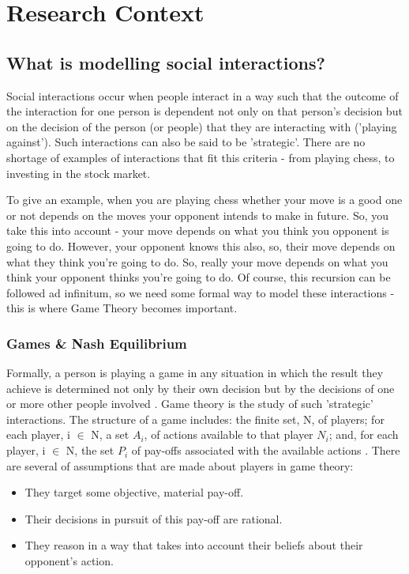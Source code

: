 \documentclass[12pt]{article}
\newcommand*{\np}{\par\noindent\newline}
\begin{document}
\section{Research Context}
\subsection{What is modelling social interactions?}
Social interactions occur when people interact in a way such that the outcome
of the interaction for one person is dependent not  only on that person's
decision but on the decision of the person (or people) that they are interacting with ('playing against'). Such interactions can also be said to be
'strategic'. There are no shortage of examples of interactions that fit this
criteria - from playing chess, to investing in the stock market.
\np To give an example, when you are playing chess whether your move is a good
one or not depends on the moves your opponent intends to make in future. So,
you take this into account - your move depends on what you think you opponent
is going to do. However, your opponent knows this also, so, their move depends
on what they think you're going to do. So, really your move depends on what you
think your opponent thinks you're going to do. Of course, this recursion can be
followed ad infinitum, so we need some formal way to model these interactions
- this is where Game Theory becomes important.

\subsubsection{Games \& Nash Equilibrium}
Formally, a person is playing a game in any situation in which the result they
achieve is determined not only by their own decision but by the decisions of
one or more other people involved \cite{angner_course_2012}. Game theory is the
study of such 'strategic' interactions.
The structure of a game includes: the finite set, N, of players; for each
player, i $\in$ N, a set $A_i$, of actions available to that player
$N_i$; and, for each player, i $\in$ N, the set $P_i$ of
pay-offs associated with the available actions \cite{osborne_course_1994}.
There are several of assumptions that are made about players in game theory:
\begin{itemize}
    \item They target some objective, material pay-off.
    \item Their decisions in pursuit of this pay-off are rational.
    \item They reason in a way that takes into account their beliefs about their opponent's action. 
\end{itemize}
\end{document}
